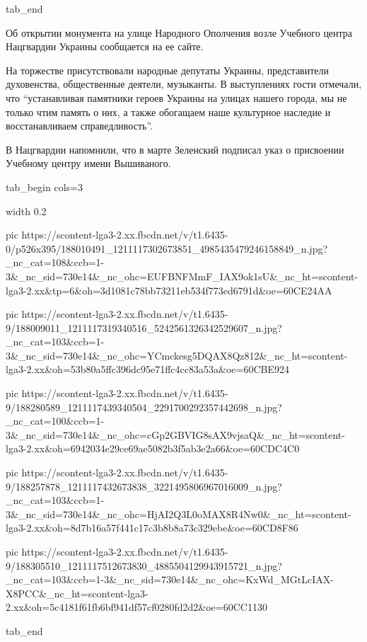 tab_end
\fi

Об открытии монумента на улице Народного Ополчения возле Учебного центра
Нацгвардии Украины сообщается на ее сайте. 

На торжестве присутствовали народные депутаты Украины, представители
духовенства, общественные деятели, музыканты. В выступлениях гости отмечали,
что \enquote{устанавливая памятники героев Украины на улицах нашего города, мы не
только чтим память о них, а также обогащаем наше культурное наследие и
восстанавливаем справедливость}.

В Нацгвардии напомнили, что в марте  Зеленский подписал указ о присвоении
Учебному центру имени  Вышиваного.

\ifcmt
tab_begin cols=3

	width 0.2

  pic https://scontent-lga3-2.xx.fbcdn.net/v/t1.6435-0/p526x395/188010491_1211117302673851_4985435479246158849_n.jpg?_nc_cat=108&ccb=1-3&_nc_sid=730e14&_nc_ohc=EUFBNFMmF_IAX9ok1sU&_nc_ht=scontent-lga3-2.xx&tp=6&oh=3d1081c78bb73211eb534f773ed6791d&oe=60CE24AA

  pic https://scontent-lga3-2.xx.fbcdn.net/v/t1.6435-9/188009011_1211117319340516_5242561326342529607_n.jpg?_nc_cat=103&ccb=1-3&_nc_sid=730e14&_nc_ohc=YCmckesg5DQAX8Qz812&_nc_ht=scontent-lga3-2.xx&oh=53b80a5ffc396dc95e71ffc4cc83a53a&oe=60CBE924

  pic https://scontent-lga3-2.xx.fbcdn.net/v/t1.6435-9/188280589_1211117439340504_2291700292357442698_n.jpg?_nc_cat=100&ccb=1-3&_nc_sid=730e14&_nc_ohc=cGp2GBVIG8sAX9vjsaQ&_nc_ht=scontent-lga3-2.xx&oh=6942034e29ce69ae5082b3f5ab3e2a66&oe=60CDC4C0

  pic https://scontent-lga3-2.xx.fbcdn.net/v/t1.6435-9/188257878_1211117432673838_3221495806967016009_n.jpg?_nc_cat=103&ccb=1-3&_nc_sid=730e14&_nc_ohc=HjAI2Q3L0oMAX8R4Nw0&_nc_ht=scontent-lga3-2.xx&oh=8d7b16a57f441c17c3b8b8a73c329ebe&oe=60CD8F86

  pic https://scontent-lga3-2.xx.fbcdn.net/v/t1.6435-9/188305510_1211117512673830_4885504129943915721_n.jpg?_nc_cat=103&ccb=1-3&_nc_sid=730e14&_nc_ohc=KxWd_MGtLcIAX-X8PCC&_nc_ht=scontent-lga3-2.xx&oh=5c4181f61fb6bf941df57cf0280fd2d2&oe=60CC1130

tab_end
\fi

